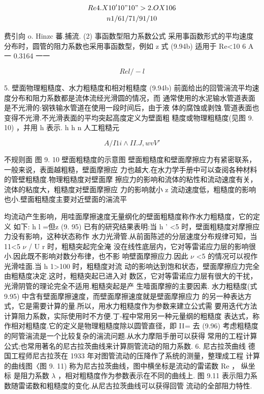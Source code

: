 \begin{gather*}
Re 4. X 10' 10" 10" >2. OX 106\\
n 1/ 6 1/7 1/9 1/10
\end{gather*}

费引向 o. Hinzc 蕃.捕流. (2) 事函数型阻力系数公式 采用事函数形式的平均速度分布时，圆管的阻力系数也采用事函数型，例如 z 式 (9.94b) 适用于 Re<10 6 A 一 0.3164 一一

\[Rel /-l\]

5. 壁面物理粗糙度、水力粗糙度和相对粗糙度 (9.94b) 前面给出的回管湍流平均速度分布和阻力系数都是流体流经光滑圆的情况，而 通常使用的水泥输水管道表面是不光滑的:钢铁输水管道在使用一段时间后，由于液 体的腐蚀或剥蚀.管道表面也变得不光滑.不光滑表面的平均突起高度定义为壁面粗 糙度或物理粗糙度(见图 9. 10) ，并用 h 表示. h h n 人工粗糙元

\[A /I1i \wedge  II.J, w v V'\]

不规则面 图 9. 10 壁面粗糙度的示意图 壁面粗糙度和壁面摩擦应力有紧密联系，一般来说，表面越粗糙，壁面摩擦应 力也越大.在水力学手册中可以查阅各种材料的管壁粗糙度.物理粗糙度对壁面摩 擦应力的影响和流体的粘性和流动速度有关，流体的粘度大，粗糙度对壁面摩擦应 力的影响就小 z 流动速度低，粗糙度的影响也小.壁面粗糙度主要对近壁面的湍流平

均流动产生影响，用哇面摩擦速度无量纲化的壁面粗糙度称作水力粗糙度，它的定义 如下: h l =但z (9. 95) 已有的研究结果表明:当 h ' <5 时，壁面粗糙度对摩擦应力没有影响，这种状态称作 水力光滑管.从前面陈述的分层速度分布规律可知，当 11<5 $\nu$ / U r 时，粗糙突起完全淹 没在线性底层内，它对等雷诺应力层的影响很小.因此既不影响对数分布律，也不影 响壁面摩擦应力.因此 $\nu$ <5 的情况可以视作光滑哇面.当 h 1>100 时，粗糙度对流 动的影响达到饱和状态，壁面摩擦应力完全由粗糙度决定.这时，粗糙突起已进入对 数区，它对等雷诺应力层有很大的干扰，光滑阴管的理论完全不适用.粗糙突起是产 生噎面摩擦的主要因素. 水力粗糙度(式 9.95) 中含有壁面摩擦速度，而壁面摩擦速度就是壁面摩擦应力 的另一种表达方式，它是需要计算的量.所以，用水力粗糙度作为参数来建立公式需 要用迭代方法计算阻力系数，实际使用时不方便.丁-程中常用另一种元量纲的粗糙度 表达式，称作相对粗糙度.它的定义是物理粗糙度除以圆管直径，即 I${\rm I}$= 去 (9.96) 考虑粗糙度的阿管湍流是一个比较复杂的湍流问题.从水力摩阻手册可以获得 常用的工程计算公式;也常用著名的尼古拉茨曲线来计算厕管流动的阻力系数. 6. 尼古拉茨曲线 德国工程师尼古拉茨在 1933 年对图管流动的压降作了系统的测量，整理成工程 计算的曲线图〈图 9. 11) 称为尼古拉茨曲线，图中横坐标是流动的雷诺数 Re ， 纵坐标 是阻力系数 $\lambda$ ，相对粗糙度作为参数表示在不同的曲线上. 图 9.11 表示阻力系数随雷诺数和粗糙度的变化.从尼古拉茨曲线可以获得回管 流动的全部阻力特性.

